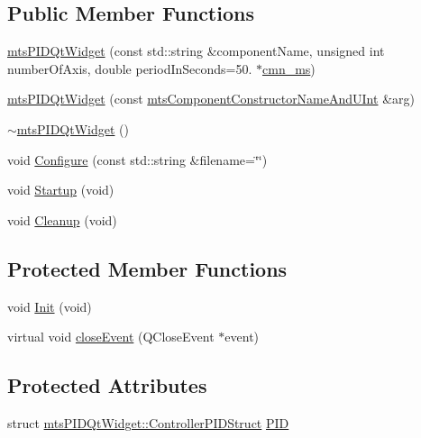 \subsection*{Public Member Functions}
\begin{DoxyCompactItemize}
\item 
\hyperlink{classmts_p_i_d_qt_widget_abae1b8bbbe0364b6247f8c96133abebd}{mts\+P\+I\+D\+Qt\+Widget} (const std\+::string \&component\+Name, unsigned int number\+Of\+Axis, double period\+In\+Seconds=50. $\ast$\hyperlink{cmn_units_8h_aaf4d3f2fafb9b4a95606544b9d876b4a}{cmn\+\_\+ms})
\item 
\hyperlink{classmts_p_i_d_qt_widget_ab679845d1345b8db4526ef7610521dc4}{mts\+P\+I\+D\+Qt\+Widget} (const \hyperlink{mts_component_8h_aa605f54730dc942fd5d3b0419fbb1aa8}{mts\+Component\+Constructor\+Name\+And\+U\+Int} \&arg)
\item 
\hyperlink{classmts_p_i_d_qt_widget_a6b5814a1e488a4450bf2940126a4b31d}{$\sim$mts\+P\+I\+D\+Qt\+Widget} ()
\item 
void \hyperlink{classmts_p_i_d_qt_widget_a097275064ba6e22790d25e22b67e9d58}{Configure} (const std\+::string \&filename=\char`\"{}\char`\"{})
\item 
void \hyperlink{classmts_p_i_d_qt_widget_afb70a26b6ec801f81b0c56975ccaa810}{Startup} (void)
\item 
void \hyperlink{classmts_p_i_d_qt_widget_a8aa6a7ff2a0a459bc052aa0c824bd0ec}{Cleanup} (void)
\end{DoxyCompactItemize}
\subsection*{Protected Member Functions}
\begin{DoxyCompactItemize}
\item 
void \hyperlink{classmts_p_i_d_qt_widget_a41879786b3d20aa0bbe5c8aafc472060}{Init} (void)
\item 
virtual void \hyperlink{classmts_p_i_d_qt_widget_a4f922ab2b52b1f5be09275eee344d01d}{close\+Event} (Q\+Close\+Event $\ast$event)
\end{DoxyCompactItemize}
\subsection*{Protected Attributes}
\begin{DoxyCompactItemize}
\item 
struct \hyperlink{structmts_p_i_d_qt_widget_1_1_controller_p_i_d_struct}{mts\+P\+I\+D\+Qt\+Widget\+::\+Controller\+P\+I\+D\+Struct} \hyperlink{classmts_p_i_d_qt_widget_afbe0f5cdbb689de97e9489b92c1d2576}{P\+I\+D}
\end{DoxyCompactItemize}
